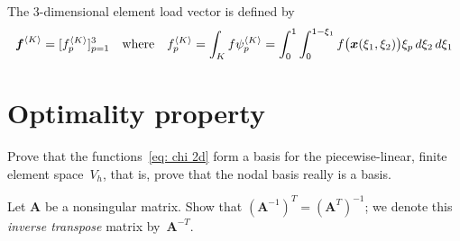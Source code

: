 The 3-dimensional element load vector is defined by
\[
\boldsymbol{f}^{\langle K\rangle}=[f^{\langle K\rangle}_p]_{p=1}^3
\quad\text{where}\quad
f^{\langle K\rangle}_p=\int_K f\psi^{\langle K\rangle}_p
	=\int_0^1\int_0^{1-\xi_1}f\bigl(\boldsymbol{x}(\xi_1,\xi_2)\bigr)\xi_p
	\,d\xi_2 \,d\xi_1
\]




\section{Optimality property}

\begin{Exercises}

\exercise\label{ex: nodal basis}
Prove that the functions~\eqref{eq: chi 2d} form a basis for the 
piecewise-linear, finite element space~$V_h$, that is, prove that the nodal 
basis really is a basis. 

\exercise\label{ex: inv transpose}
Let $\boldsymbol{A}$ be a nonsingular matrix.
Show that $(\boldsymbol{A}^{-1})^T=(\boldsymbol{A}^T)^{-1}$; we denote this 
\emph{inverse transpose} matrix by~$\boldsymbol{A}^{-T}$.
\end{Exercises}
